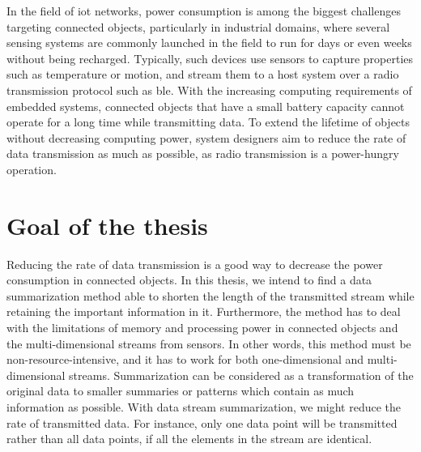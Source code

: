 In the field of \acrshort{iot} networks, power consumption is among the biggest
challenges targeting connected objects, particularly in industrial domains,
where several sensing systems are commonly launched in the field to run for days
or even weeks without being recharged. Typically, such devices use sensors to
capture properties such as temperature or motion, and stream them to a host
system over a radio transmission protocol such as \acrfull{ble}. With the
increasing computing requirements of embedded systems,
connected objects that have a small battery capacity cannot operate for a
long time while transmitting data. To extend the lifetime of objects without decreasing computing power,
system designers aim to reduce the rate of data transmission as much as
possible, as radio transmission is a power-hungry operation.


\section{Goal of the thesis}

Reducing the rate of data transmission is a good way to decrease the power
consumption in connected objects. In this thesis, we intend to find
a data summarization method able to shorten the length of
the transmitted stream while retaining the important information in it. Furthermore, the
method has to deal with the limitations of memory and processing power in
connected objects and the multi-dimensional streams from sensors. In other
words, this method must be non-resource-intensive, and it has to work for both
one-dimensional and multi-dimensional streams.
Summarization can be considered as a transformation of the original data to
smaller summaries or patterns which contain as much information as possible.
With data stream summarization, we might reduce the rate of transmitted data.
For instance, only one data point will be transmitted rather than all data
points, if all the elements in the stream are identical. 

